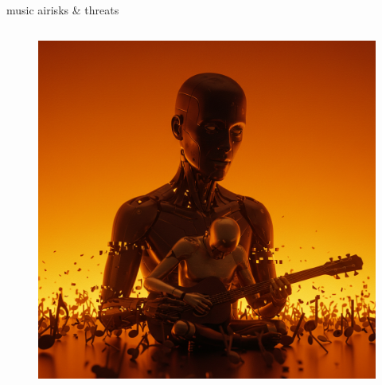\begin{frame}{music ai}{risks \& threats}
\begin{columns}
\begin{figure}
            \includegraphics[width=\columnwidth]{graph/ai_risk}
        \end{figure}
    \end{columns}
\end{frame}




